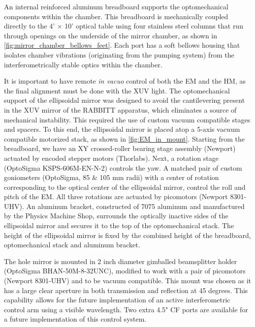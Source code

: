 An internal reinforced aluminum breadboard supports the optomechanical components within the chamber. This breadboard is mechanically coupled directly to the 4' $\times$ 10' optical table using four stainless steel columns that run through openings on the underside of the mirror chamber, as shown in \cref{fig:mirror_chamber_bellows_feet}. Each port has a soft bellows housing that isolates chamber vibrations (originating from the pumping system) from the interferometrically stable optics within the chamber. 

It is important to have remote \textit{in vacuo} control of both the EM and the HM, as the final alignment must be done with the XUV light. The optomechanical support of the ellipsoidal mirror was designed to avoid the cantilevering present in the XUV mirror of the RABBITT apparatus, which eliminates a source of mechanical instability. This required the use of custom vacuum compatible stages and spacers. To this end, the ellipsoidal mirror is placed atop a 5-axis vacuum compatible motorized stack, as shown in \cref{fig:EM_in_mount}. Starting from the breadboard, we have an XY crossed-roller bearing stage assembly (Newport) actuated by encoded stepper motors (Thorlabs). Next, a rotation stage (OptoSigma KSPS-606M-EN-N-2) controls the yaw. A matched pair of custom goniometers (OptoSigma, 85 \& 105 mm radii) with a center of rotation corresponding to the optical center of the ellipsoidal mirror, control the roll and pitch of the EM. All three rotations are actuated by picomotors (Newport 8301-UHV). An aluminum bracket, constructed of 7075 aluminum and manufactured by the Physics Machine Shop, surrounds the optically inactive sides of the ellipsoidal mirror and secures it to the top of the optomechanical stack. The height of the ellipsoidal mirror is fixed by the combined height of the breadboard, optomechanical stack and aluminum bracket.

The hole mirror is mounted in 2 inch diameter gimballed beamsplitter holder (OptoSigma BHAN-50M-8-32UNC), modified to work with a pair of picomotors (Newport 8301-UHV) and to be vacuum compatible. This mount was chosen as it has a large clear aperture in both transmission and reflection at 45 degrees. This capability allows for the future implementation of an active interferometric control arm using a visible wavelength. Two extra 4.5" CF ports are available for a future implementation of this control system.

